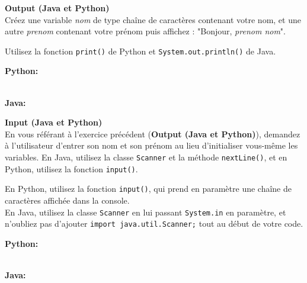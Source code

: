 \begin{Exercice}[5 minutes] \textbf{Output (Java et Python)}\\
   Créez une variable \textit{nom} de type chaîne de caractères contenant votre nom, et une autre \textit{prenom} contenant votre prénom puis affichez : "Bonjour, \textit{prenom nom}". \\
   
    \begin{conseil}
        Utilisez la fonction \lstinline{print()} de Python et \lstinline{System.out.println()} de Java. 
        
    \end{conseil}
    \begin{solution}
    
    \textbf{Python:} 
    
    
    \textbf{\\Java:} 
      
    \end{solution}   
\end{Exercice}

\begin{Exercice}[5 minutes] \textbf{Input (Java et Python)}\\
   En vous référant à l'exercice précédent (\textbf{Output (Java et Python)}), demandez à l'utilisateur d'entrer son nom et son prénom au lieu d'initialiser vous-même les variables. En Java, utilisez la classe \lstinline{Scanner} et la méthode \lstinline{nextLine()}, et en Python, utilisez la fonction \lstinline{input()}. \\
   
    \begin{conseil}
       En Python, utilisez la fonction \lstinline{input()}, qui prend en paramètre une chaîne de caractères affichée dans la console. \\

        En Java, utilisez la classe \lstinline{Scanner} en lui passant \lstinline{System.in} en paramètre, et n'oubliez pas d'ajouter \lstinline{import java.util.Scanner;} tout au début de votre code.
    \end{conseil}
    \begin{solution}
    
    \textbf{Python:} 
    
    
    \textbf{\\Java:}
      
       
        
    \end{solution}   
\end{Exercice}



